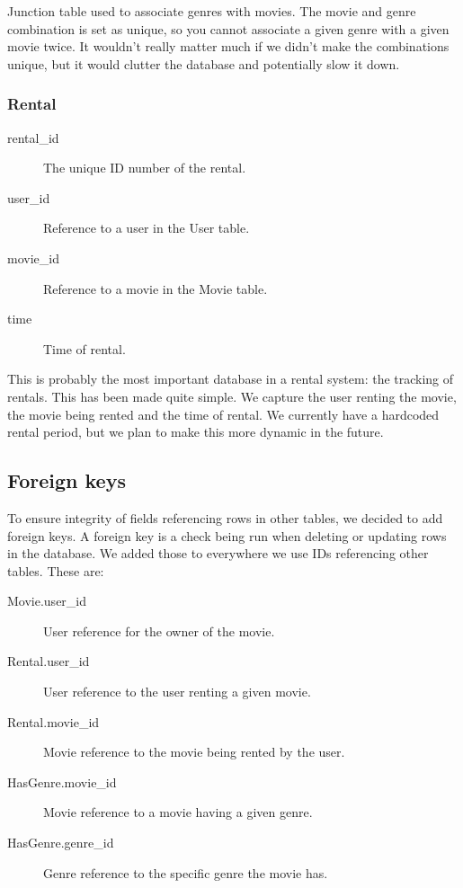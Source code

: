 Junction table used to associate genres with movies. The movie and genre combination is set as unique, so you cannot associate a given genre with a given movie twice. It wouldn't really matter much if we didn't make the combinations unique, but it would clutter the database and potentially slow it down.

\subsubsection{Rental}
\label{Design_Database_Tables_Rental}

\begin{description}
\item[rental\_id] The unique ID number of the rental.
\item[user\_id] Reference to a user in the User table.
\item[movie\_id] Reference to a movie in the Movie table.
\item[time] Time of rental.
\end{description}

This is probably the most important database in a rental system: the tracking of rentals. This has been made quite simple. We capture the user renting the movie, the movie being rented and the time of rental. We currently have a hardcoded rental period, but we plan to make this more dynamic in the future.

\subsection{Foreign keys}
\label{Design_Database_Foreignkeys}
To ensure integrity of fields referencing rows in other tables, we decided to add foreign keys. A foreign key is a check being run when deleting or updating rows in the database. We added those to everywhere we use IDs referencing other tables. These are:

\begin{description}
\item[Movie.user\_id] User reference for the owner of the movie.
\item[Rental.user\_id] User reference to the user renting a given movie.
\item[Rental.movie\_id] Movie reference to the movie being rented by the user.
\item[HasGenre.movie\_id] Movie reference to a movie having a given genre.
\item[HasGenre.genre\_id] Genre reference to the specific genre the movie has.
\end{description}

